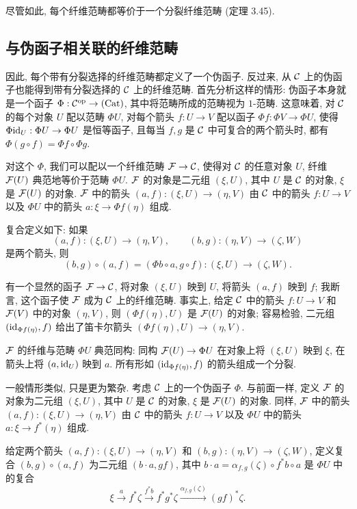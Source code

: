 尽管如此, 每个纤维范畴都等价于一个分裂纤维范畴 (定理 3.45).

\subsection{与伪函子相关联的纤维范畴}
因此, 每个带有分裂选择的纤维范畴都定义了一个伪函子. 反过来, 从 $\mathcal C$ 上的伪函子也能得到带有分裂选择的 $\mathcal C$ 上的纤维范畴. 首先分析这样的情形: 伪函子本身就是一个函子 $\Phi:\mathcal C^{\mathrm{op}}\to(\mathrm{Cat})$, 其中将范畴所成的范畴视为 $1$-范畴. 这意味着, 对 $\mathcal C$ 的每个对象 $U$ 配以范畴 $\Phi U$, 对每个箭头 $f:U\to V$ 配以函子 $\Phi f:\Phi V\to\Phi U$, 使得 $\Phi\mathrm{id}_U:\Phi U\to\Phi U$ 是恒等函子, 且每当 $f,g$ 是 $\mathcal C$ 中可复合的两个箭头时, 都有 $\Phi(g\circ f)=\Phi f\circ\Phi g$.

对这个 $\Phi$, 我们可以配以一个纤维范畴 $\mathcal F\to\mathcal C$, 使得对 $\mathcal C$ 的任意对象 $U$, 纤维 $\mathcal F(U)$ 典范地等价于范畴 $\Phi U$. $\mathcal F$ 的对象是二元组 $(\xi,U)$, 其中 $U$ 是 $\mathcal C$ 的对象, $\xi$ 是 $\mathcal F(U)$ 的对象. $\mathcal F$ 中的箭头 $(a,f):(\xi,U)\to(\eta,V)$ 由 $\mathcal C$ 中的箭头 $f:U\to V$ 以及 $\Phi U$ 中的箭头 $a:\xi\to\Phi f(\eta)$ 组成.

复合定义如下: 如果
\[
(a,f):(\xi,U)\longrightarrow(\eta,V),\qquad
(b,g):(\eta,V)\longrightarrow(\zeta,W)
\]
是两个箭头, 则
\[
(b,g)\circ(a,f)=(\Phi b\circ a,g\circ f):(\xi,U)\longrightarrow(\zeta,W).
\]

有一个显然的函子 $\mathcal F\to\mathcal C$, 将对象 $(\xi,U)$ 映到 $U$, 将箭头 $(a,f)$ 映到 $f$; 我断言, 这个函子使 $\mathcal F$ 成为 $\mathcal C$ 上的纤维范畴.
事实上, 给定 $\mathcal C$ 中的箭头 $f:U\to V$ 和 $\mathcal F(V)$ 中的对象 $(\eta,V)$, 则 $(\Phi f(\eta),U)$ 是 $\mathcal F(U)$ 的对象; 容易检验, 二元组 $(\mathrm{id}_{\Phi f(\eta)},f)$ 给出了笛卡尔箭头 $(\Phi f(\eta),U)\to(\eta,V)$.

$\mathcal F$ 的纤维与范畴 $\Phi U$ 典范同构: 同构 $\mathcal F(U)\to\Phi U$ 在对象上将 $(\xi,U)$ 映到 $\xi$, 在箭头上将 $(a,\mathrm{id}_U)$ 映到 $a$. 所有形如 $(\mathrm{id}_{\Phi f(\eta)},f)$ 的箭头组成一个分裂.

一般情形类似, 只是更为繁杂. 考虑 $\mathcal C$ 上的一个伪函子 $\Phi$. 与前面一样, 定义 $\mathcal F$ 的对象为二元组 $(\xi,U)$, 其中 $U$ 是 $\mathcal C$ 的对象, $\xi$ 是 $\mathcal F(U)$ 的对象. 同样, $\mathcal F$ 中的箭头 $(a,f):(\xi,U)\to(\eta,V)$ 由 $\mathcal C$ 中的箭头 $f:U\to V$ 以及 $\Phi U$ 中的箭头 $a:\xi\to f^*(\eta)$ 组成.

给定两个箭头 $(a,f):(\xi,U)\to(\eta,V)$ 和 $(b,g):(\eta,V)\to(\zeta,W)$, 定义复合 $(b,g)\circ(a,f)$ 为二元组 $(b\cdot a,gf)$, 其中 $b\cdot a=\alpha_{f,g}(\zeta)\circ f^*b\circ a$ 是 $\Phi U$ 中的复合
\[
\xi\xrightarrow{a}f^*\zeta\xrightarrow{f^*b}f^*g^*\zeta
\xrightarrow{\alpha_{f,g}(\zeta)}(gf)^*\zeta.
\]

